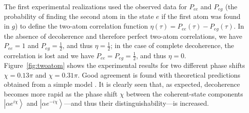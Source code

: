 \documentclass[3p,sort&compress]{elsarticle}
\newcommand{\ket}[1]{\left\vert{#1}\right\rangle}
\newcommand{\E}{\ensuremath{e}}
\newcommand{\I}{\ensuremath{i}}
\begin{document}
The first experimental realizations \cite{Brune:1996:om,Maitre:1997:tv} used the observed data for $P_{ee}$ and $P_{eg}$ (the probability of finding the second atom in the state $e$ if the first atom was found in $g$) to define the two-atom correlation function $\eta(\tau)=P_{ee}(\tau)-P_{eg}(\tau)$. In the absence of decoherence and therefore perfect two-atom correlations, we have $P_{ee}=1$ and $P_{eg}=\frac{1}{2}$, and thus $\eta=\frac{1}{2}$; in the case of complete decoherence, the correlation is lost and we have $P_{ee}=P_{eg}=\frac{1}{2}$, and thus $\eta=0$. Figure~\ref{fig:twoatom} shows the experimental results for two different phase shifts $\chi=0.13\pi$ and $\chi=0.31\pi$. Good agreement is found with theoretical predictions obtained from a simple model \cite{Davidovich:1996:sa,Maitre:1997:tv}. It is clearly seen that, as expected, decoherence becomes more rapid as the phase shift $\chi$ between the coherent-state components $\ket{\alpha \E^{\I \chi}}$ and $\ket{\alpha \E^{-\I \chi}}$---and thus their distinguishability---is increased. 
\end{document}
